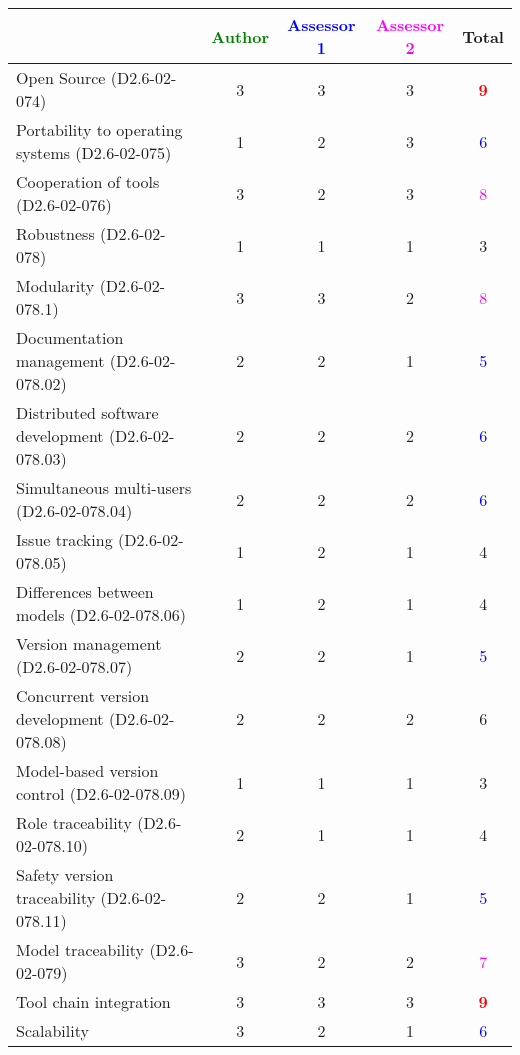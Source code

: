 \begin{tabular}{|l | c | c | c | c|}
\hline
& \textcolor{green}{Author} & \textcolor{blue}{Assessor 1} & \textcolor{magenta}{Assessor 2} & Total \\
\hline
Open Source (D2.6-02-074) & 3     & 3     & 3     & \textcolor{red}{\textbf{9}} \\
\hline
Portability to operating systems (D2.6-02-075) & 1     & 2     &  3 & \textcolor{blue}{6} \\
\hline
Cooperation of tools (D2.6-02-076) & 3     & 2     & 3     & \textcolor{magenta}{8} \\
\hline
Robustness (D2.6-02-078) & 1     & 1     & 1     & 3     \\
\hline
Modularity (D2.6-02-078.1) & 3     & 3     & 2     & \textcolor{magenta}{8} \\
\hline
Documentation management (D2.6-02-078.02) & 2     & 2     & 1      & \textcolor{blue}{5} \\
\hline
Distributed software development (D2.6-02-078.03) & 2     & 2     & 2     & \textcolor{blue}{6} \\
\hline
Simultaneous multi-users (D2.6-02-078.04) & 2     & 2     & 2     & \textcolor{blue}{6} \\
\hline
Issue tracking (D2.6-02-078.05) & 1     & 2     & 1     & 4     \\
\hline
Differences between models (D2.6-02-078.06) & 1     & 2     & 1     & 4     \\
\hline
Version management (D2.6-02-078.07) & 2     & 2     & 1     & \textcolor{blue}{5} \\
\hline
Concurrent version development (D2.6-02-078.08) & 2     & 2     & 2     &  6\\
\hline
Model-based version control (D2.6-02-078.09) & 1     & 1     & 1     & 3     \\
\hline
Role traceability (D2.6-02-078.10) & 2     & 1     & 1     & 4     \\
\hline
Safety version traceability (D2.6-02-078.11) & 2     & 2     & 1     & \textcolor{blue}{5} \\
\hline
Model traceability (D2.6-02-079) & 3     & 2     & 2     & \textcolor{magenta}{7} \\
\hline
Tool chain integration & 3     & 3     & 3     & \textcolor{red}{\textbf{9}} \\
\hline
Scalability & 3     & 2     & 1     & \textcolor{blue}{6} \\
\hline
\end{tabular}

